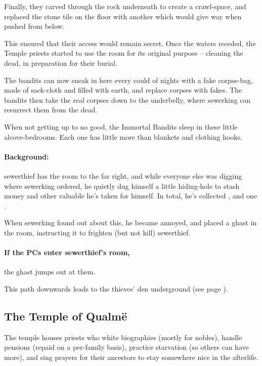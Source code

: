 \begin{multicols}{2}
Finally, they carved through the rock underneath to create a crawl-space, and replaced the stone tile on the floor with another which would give way when pushed from below.

This ensured that their access would remain secret.
Once the waters receded, the Temple priests started to use the room for its original purpose -- cleaning the dead, in preparation for their burial.

The bandits can now sneak in here every could of nights with a fake corpse-bag, made of sack-cloth and filled with earth, and replace corpses with fakes.
The bandits then take the real corpses down to the underbelly, where \gls{sewerking} can resurrect them from the dead.


When not getting up to no good, the Immortal Bandits sleep in these little alcove-bedrooms.
Each one has little more than blankets and clothing hooks.

\paragraph{Background:}
\Gls{sewerthief} has the room to the far right, and while everyone else was digging where \gls{sewerking} ordered, he quietly dug himself a little hiding-hole to stash money and other valuable he's taken for himself.
In total, he's collected \lootMedium, and one \lootMagic.

When \gls{sewerking} found out about this, he became annoyed, and placed a ghast in the room, instructing it to frighten (but not kill) \gls{sewerthief}.

\paragraph{If the PCs enter \gls{sewerthief}'s room,}
the ghast jumps out at them.

\ghast

This path downwards leads to the thieves' den underground (see page \pageref{sewerPigWalk}).

\subsection{The Temple of Qualm\"e}

The temple houses priests who white biographies (mostly for nobles), handle pensions (repaid on a per-family basis), practice starvation (so others can have more), and sing prayers for their ancestors to stay somewhere nice in the afterlife.


\end{multicols}
